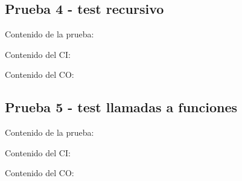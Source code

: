 \documentclass[11pt, , a4paper, titlepage]{article}
\newenvironment{changemargin}[2]{%
\begin{list}{}{%
\setlength{\topsep}{0pt}%
\setlength{\leftmargin}{#1}%
\setlength{\rightmargin}{#2}%
\setlength{\listparindent}{\parindent}%
\setlength{\itemindent}{\parindent}%
\setlength{\parsep}{\parskip}%
}%
\item[]}{\end{list}}
\begin{document}
\clearpage

\subsection{Prueba 4 - test recursivo}
\vspace{2mm}
Contenido de la prueba:
\vspace{2mm}
\begin{changemargin}{+3cm}{+2cm}
    
\end{changemargin} 
\vspace{2mm}
Contenido del CI:
\vspace{2mm}
\begin{changemargin}{+1cm}{+0cm}
    
\end{changemargin} 
\vspace{2mm}
Contenido del CO:
\vspace{2mm}
\begin{changemargin}{+1cm}{-2cm}
    
\end{changemargin} 

\clearpage

\subsection{Prueba 5 - test llamadas a funciones}
\vspace{2mm}
Contenido de la prueba:
\vspace{2mm}
\begin{changemargin}{+3cm}{+2cm}
    
\end{changemargin} 
\vspace{2mm}
Contenido del CI:
\vspace{2mm}
\begin{changemargin}{+1cm}{+0cm}
    
\end{changemargin} 
\vspace{2mm}
Contenido del CO:
\vspace{2mm}
\begin{changemargin}{+1cm}{-2cm}
    
\end{changemargin} 

\clearpage

\printbibliography[heading=bibnumbered]
\end{document}
